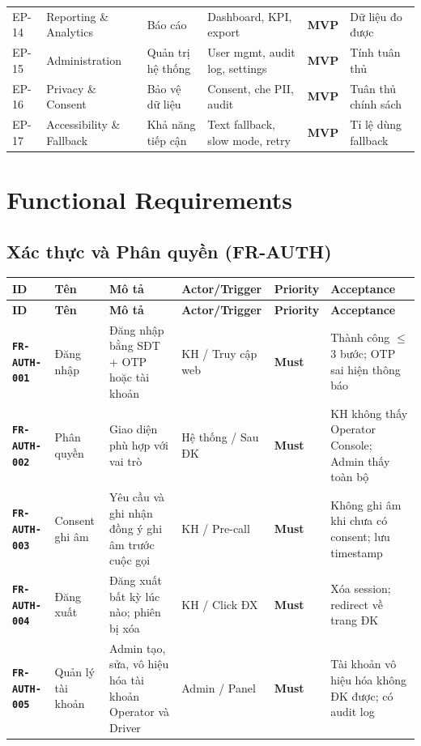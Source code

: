 \documentclass[12pt,a4paper]{article}
\newcommand{\reqid}[1]{\texttt{\textbf{\color{AloBlue}#1}}}
\newcommand{\musthave}{\colorbox{PrioMust}{\small\textbf{Must}}}
\newcommand{\mvptag}{\colorbox{AloLightBlue}{\small\textbf{MVP}}}
\begin{document}
\begin{longtable}{L{2cm} L{2.5cm} L{3cm} L{3.5cm} C{1.5cm} L{2.5cm}}
  EP-14 & Reporting \& Analytics & Báo cáo & Dashboard, KPI, export & \mvptag & Dữ liệu đo được \\
  EP-15 & Administration & Quản trị hệ thống & User mgmt, audit log, settings & \mvptag & Tính tuân thủ \\
  EP-16 & Privacy \& Consent & Bảo vệ dữ liệu & Consent, che PII, audit & \mvptag & Tuân thủ chính sách \\
  EP-17 & Accessibility \& Fallback & Khả năng tiếp cận & Text fallback, slow mode, retry & \mvptag & Tỉ lệ dùng fallback \\
\end{longtable}

\section{Functional Requirements}

\small

\subsection{Xác thực và Phân quyền (FR-AUTH)}
\begin{longtable}{L{2.2cm} L{2cm} L{3.8cm} L{3cm} C{1.5cm} L{3cm}}
  \toprule{}\textbf{ID}&\textbf{Tên}&\textbf{Mô tả}&\textbf{Actor/Trigger}&\textbf{Priority}&\textbf{Acceptance}\\
  \midrule\endfirsthead\toprule{}\textbf{ID}&\textbf{Tên}&\textbf{Mô tả}&\textbf{Actor/Trigger}&\textbf{Priority}&\textbf{Acceptance}\\\midrule\endhead\bottomrule\endlastfoot
  \reqid{FR-AUTH-001} & Đăng nhập & Đăng nhập bằng SĐT + OTP hoặc tài khoản & KH / Truy cập web & \musthave & Thành công $\leq$3 bước; OTP sai hiện thông báo \\
  \reqid{FR-AUTH-002} & Phân quyền & Giao diện phù hợp với vai trò & Hệ thống / Sau ĐK & \musthave & KH không thấy Operator Console; Admin thấy toàn bộ \\
  \reqid{FR-AUTH-003} & Consent ghi âm & Yêu cầu và ghi nhận đồng ý ghi âm trước cuộc gọi & KH / Pre-call & \musthave & Không ghi âm khi chưa có consent; lưu timestamp \\
  \reqid{FR-AUTH-004} & Đăng xuất & Đăng xuất bất kỳ lúc nào; phiên bị xóa & KH / Click ĐX & \musthave & Xóa session; redirect về trang ĐK \\
  \reqid{FR-AUTH-005} & Quản lý tài khoản & Admin tạo, sửa, vô hiệu hóa tài khoản Operator và Driver & Admin / Panel & \musthave & Tài khoản vô hiệu hóa không ĐK được; có audit log \\
\end{longtable}
\end{document}
